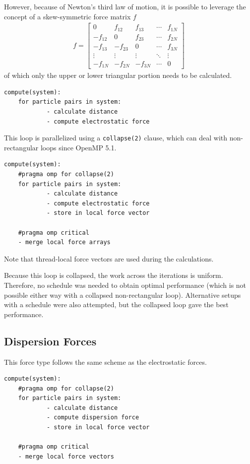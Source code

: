 \documentclass[conference]{IEEEtran}
\begin{document}
However, because of Newton's third law of motion, it is possible to leverage the concept of a skew-symmetric 
force matrix $f$
\begin{align*}
        f =
        \begin{bmatrix}
        0 & f_{12} & f_{13} & \cdots & f_{1N} \\
        -f_{12} & 0 & f_{23} & \cdots & f_{2N} \\
        -f_{13} & -f_{23} & 0 & \cdots & f_{3N} \\
        \vdots & \vdots & \vdots & \ddots & \vdots \\
        -f_{1N} & -f_{2N} & -f_{3N} & \cdots & 0
        \end{bmatrix}  
\end{align*}
of which only the upper or lower triangular portion needs to be calculated.
\begin{lstlisting}
compute(system):
    for particle pairs in system:
            - calculate distance
            - compute electrostatic force
\end{lstlisting}

This loop is parallelized using a
\verb|collapse(2)| clause, which can deal with non-rectangular loops since OpenMP 5.1.
\begin{lstlisting}
compute(system):
    #pragma omp for collapse(2)
    for particle pairs in system:
            - calculate distance
            - compute electrostatic force
            - store in local force vector

    #pragma omp critical
    - merge local force arrays
\end{lstlisting}

Note that thread-local force vectors are used during the calculations.

Because this loop is collapsed, the work across the iterations is uniform. Therefore, no schedule was needed to 
obtain optimal performance (which is not possible either way with a collapsed non-rectangular loop). Alternative setups 
with a schedule were also attempted, but the collapsed loop gave the best performance.

\subsection{Dispersion Forces}
This force type follows the same scheme as the electrostatic forces.

\begin{lstlisting}
compute(system):
    #pragma omp for collapse(2)
    for particle pairs in system:
            - calculate distance
            - compute dispersion force
            - store in local force vector

    #pragma omp critical
    - merge local force vectors
\end{lstlisting}
\end{document}
